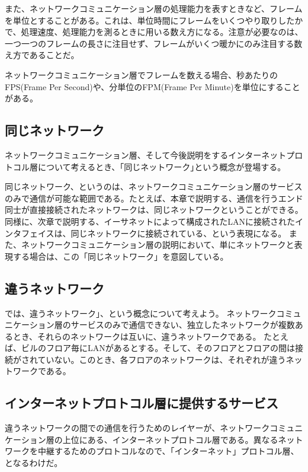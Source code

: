 また、ネットワークコミュニケーション層の処理能力を表すときなど、フレームを単位とすることがある。これは、単位時間にフレームをいくつやり取りしたかで、処理速度、処理能力を測るときに用いる数え方になる。注意が必要なのは、一つ一つのフレームの長さに注目せず、フレームがいくつ暖かにのみ注目する数え方であることだ。

ネットワークコミュニケーション層でフレームを数える場合、秒あたりのFPS(Frame Per Second)や、分単位のFPM(Frame Per Minute)を単位にすることがある。

\subsection{同じネットワーク}
ネットワークコミュニケーション層、そして今後説明をするインターネットプロトコル層について考えるとき、｢同じネットワーク｣という概念が登場する。

同じネットワーク、というのは、ネットワークコミュニケーション層のサービスのみで通信が可能な範囲である。たとえば、本章で説明する、通信を行うエンド同士が直接接続されたネットワークは、同じネットワークということができる。同様に、次章で説明する、イーサネットによって構成されたLANに接続されたインタフェイスは、同じネットワークに接続されている、という表現になる。
また、ネットワークコミュニケーション層の説明において、単にネットワークと表現する場合は、この「同じネットワーク」を意図している。


\subsection{違うネットワーク}

では、違うネットワーク｣、という概念について考えよう。
ネットワークコミュニケーション層のサービスのみで通信できない、独立したネットワークが複数あるとき、それらのネットワークは互いに、違うネットワークである。
たとえば、ビルのフロア毎にLANがあるとする。そして、そのフロアとフロアの間は接続がされていない。このとき、各フロアのネットワークは、それぞれが違うネットワークである。

\subsection{インターネットプロトコル層に提供するサービス}

違うネットワークの間での通信を行うためのレイヤーが、ネットワークコミュニケーション層の上位にある、インターネットプロトコル層である。異なるネットワークを中継するためのプロトコルなので、「インターネット」プロトコル層、となるわけだ。

